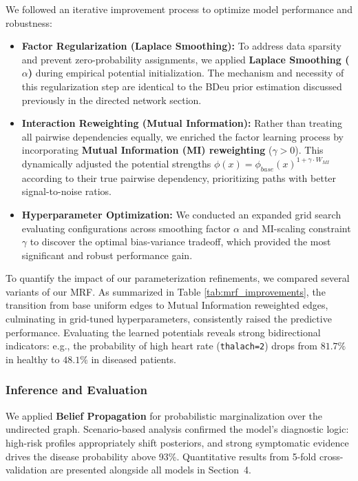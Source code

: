 \documentclass{article}
\begin{document}
We followed an iterative improvement process to optimize model performance and robustness:
\begin{itemize}
    \item \textbf{Factor Regularization (Laplace Smoothing):} To address data sparsity and prevent zero-probability assignments, we applied \textbf{Laplace Smoothing ($\alpha$)} during empirical potential initialization. The mechanism and necessity of this regularization step are identical to the BDeu prior estimation discussed previously in the directed network section.
    \item \textbf{Interaction Reweighting (Mutual Information):} Rather than treating all pairwise dependencies equally, we enriched the factor learning process by incorporating \textbf{Mutual Information (MI) reweighting} ($\gamma > 0$). This dynamically adjusted the potential strengths $\phi(x) = \phi_{base}(x)^{1 + \gamma \cdot W_{MI}}$ according to their true pairwise dependency, prioritizing paths with better signal-to-noise ratios.
    \item \textbf{Hyperparameter Optimization:} We conducted an expanded grid search evaluating configurations across smoothing factor $\alpha$ and MI-scaling constraint $\gamma$ to discover the optimal bias-variance tradeoff, which provided the most significant and robust performance gain.
\end{itemize}
To quantify the impact of our parameterization refinements, we compared several variants of our MRF. As summarized in Table \ref{tab:mrf_improvements}, the transition from base uniform edges to Mutual Information reweighted edges, culminating in grid-tuned hyperparameters, consistently raised the predictive performance. Evaluating the learned potentials reveals strong bidirectional indicators: e.g., the probability of high heart rate (\texttt{thalach=2}) drops from $81.7\%$ in healthy to $48.1\%$ in diseased patients.

\subsubsection{Inference and Evaluation}

We applied \textbf{Belief Propagation} for probabilistic marginalization over the undirected graph. Scenario-based analysis confirmed the model's diagnostic logic: high-risk profiles appropriately shift posteriors, and strong symptomatic evidence drives the disease probability above 93\%. Quantitative results from 5-fold cross-validation are presented alongside all models in Section~4.
\end{document}
